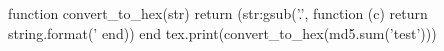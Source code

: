 \documentclass{article}
\begin{document}
\begin{luacode}
function convert_to_hex(str)
    return (str:gsub('.', function (c)
        return string.format('%
    end))
end
tex.print(convert_to_hex(md5.sum('test')))
\end{luacode}
\end{document}
